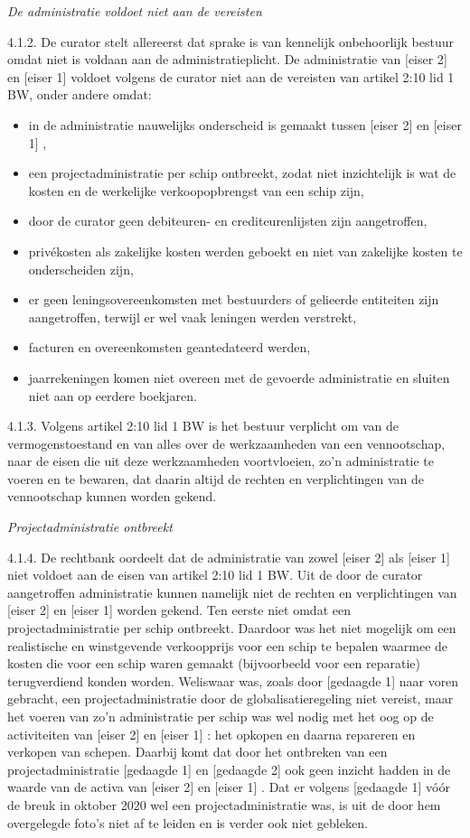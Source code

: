 \documentclass[
  dutch,
  a4paper,
]{article}
\begin{document}
\emph{De administratie voldoet niet aan de vereisten}

4.1.2. De curator stelt allereerst dat sprake is van kennelijk onbehoorlijk bestuur omdat niet is voldaan aan de administratieplicht. De administratie van {[}eiser 2{]} en {[}eiser 1{]} voldoet volgens de curator niet aan de vereisten van artikel 2:10 lid 1 BW, onder andere omdat:

\begin{itemize}
\item
  in de administratie nauwelijks onderscheid is gemaakt tussen {[}eiser 2{]} en {[}eiser 1{]} ,
\item
  een projectadministratie per schip ontbreekt, zodat niet inzichtelijk is wat de kosten en de werkelijke verkoopopbrengst van een schip zijn,
\item
  door de curator geen debiteuren- en crediteurenlijsten zijn aangetroffen,
\item
  privékosten als zakelijke kosten werden geboekt en niet van zakelijke kosten te onderscheiden zijn,
\item
  er geen leningsovereenkomsten met bestuurders of gelieerde entiteiten zijn aangetroffen, terwijl er wel vaak leningen werden verstrekt,
\item
  facturen en overeenkomsten geantedateerd werden,
\item
  jaarrekeningen komen niet overeen met de gevoerde administratie en sluiten niet aan op eerdere boekjaren.
\end{itemize}

4.1.3. Volgens artikel 2:10 lid 1 BW is het bestuur verplicht om van de vermogenstoestand en van alles over de werkzaamheden van een vennootschap, naar de eisen die uit deze werkzaamheden voortvloeien, zo'n administratie te voeren en te bewaren, dat daarin altijd de rechten en verplichtingen van de vennootschap kunnen worden gekend.

\emph{Projectadministratie ontbreekt}

4.1.4. De rechtbank oordeelt dat de administratie van zowel {[}eiser 2{]} als {[}eiser 1{]} niet voldoet aan de eisen van artikel 2:10 lid 1 BW. Uit de door de curator aangetroffen administratie kunnen namelijk niet de rechten en verplichtingen van {[}eiser 2{]} en {[}eiser 1{]} worden gekend. Ten eerste niet omdat een projectadministratie per schip ontbreekt. Daardoor was het niet mogelijk om een realistische en winstgevende verkoopprijs voor een schip te bepalen waarmee de kosten die voor een schip waren gemaakt (bijvoorbeeld voor een reparatie) terugverdiend konden worden. Weliswaar was, zoals door {[}gedaagde 1{]} naar voren gebracht, een projectadministratie door de globalisatieregeling niet vereist, maar het voeren van zo'n administratie per schip was wel nodig met het oog op de activiteiten van {[}eiser 2{]} en {[}eiser 1{]} : het opkopen en daarna repareren en verkopen van schepen. Daarbij komt dat door het ontbreken van een projectadministratie {[}gedaagde 1{]} en {[}gedaagde 2{]} ook geen inzicht hadden in de waarde van de activa van {[}eiser 2{]} en {[}eiser 1{]} . Dat er volgens {[}gedaagde 1{]} vóór de breuk in oktober 2020 wel een projectadministratie was, is uit de door hem overgelegde foto's niet af te leiden en is verder ook niet gebleken.
\end{document}
